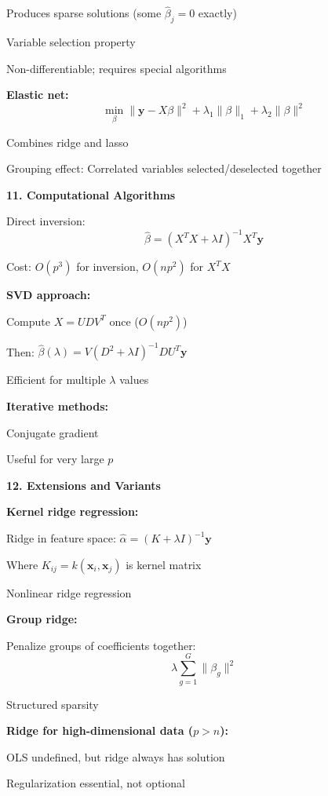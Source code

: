 \documentclass[12pt]{article}
\begin{document}
\begin{explanation}
Produces sparse solutions (some $\hat{\beta}_j = 0$ exactly)

Variable selection property

Non-differentiable; requires special algorithms

\textbf{Elastic net:}
\[\min_{\beta} \|\mathbf{y} - X\beta\|^2 + \lambda_1 \|\beta\|_1 + \lambda_2 \|\beta\|^2\]

Combines ridge and lasso

Grouping effect: Correlated variables selected/deselected together

\textbf{11. Computational Algorithms}

Direct inversion:
\[\hat{\beta} = (X^TX + \lambda I)^{-1}X^T\mathbf{y}\]

Cost: $O(p^3)$ for inversion, $O(np^2)$ for $X^TX$

\textbf{SVD approach:}

Compute $X = UDV^T$ once ($O(np^2)$)

Then: $\hat{\beta}(\lambda) = V(D^2 + \lambda I)^{-1}DU^T\mathbf{y}$

Efficient for multiple $\lambda$ values

\textbf{Iterative methods:}

Conjugate gradient

Useful for very large $p$

\textbf{12. Extensions and Variants}

\textbf{Kernel ridge regression:}

Ridge in feature space: $\hat{\alpha} = (K + \lambda I)^{-1}\mathbf{y}$

Where $K_{ij} = k(\mathbf{x}_i, \mathbf{x}_j)$ is kernel matrix

Nonlinear ridge regression

\textbf{Group ridge:}

Penalize groups of coefficients together:
\[\lambda \sum_{g=1}^{G} \|\beta_g\|^2\]

Structured sparsity

\textbf{Ridge for high-dimensional data ($p > n$):}

OLS undefined, but ridge always has solution

Regularization essential, not optional

\end{explanation}
\end{document}
